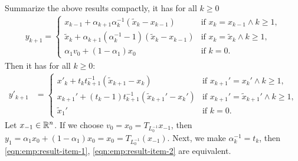 \documentclass[12pt]{report}
\begin{document}
\begin{example}
            \par
            Summarize the above results compactly, it has for all $k \ge 0$
            \begin{align}\label{eqn:emp:result-item-1}
                y_{k + 1} = \begin{cases}
                    x_{k - 1} + \alpha_{k + 1}\alpha_k^{-1}(\tilde x_k - x_{k - 1})
                    & \text{if } x_k = x_{k - 1} \wedge k \ge 1,
                    \\
                    \tilde x_k + \alpha_{k + 1}(\alpha_k^{-1} - 1)(\tilde x_k - x_{k - 1})
                    & \text{if } x_k = \tilde x_k \wedge k \ge 1,
                    \\
                    \alpha_1v_0 + (1 - \alpha_1)x_0 & \text{if } k = 0. 
                \end{cases}
            \end{align}
            Then it has for all $k \ge 0$: 
            \begin{align}\label{eqn:emp:result-item-2}
                y'_{k + 1} &= 
                \begin{cases}
                    x'_k + t_kt_{k + 1}^{-1}(\tilde x_{k + 1} - x_k) 
                    & \text{if } x_{k + 1}' = x_k' \wedge k \ge 1,
                    \\
                    x_{k + 1}' + (t_k - 1)t_{k + 1}^{-1}(\tilde x_{k + 1}' - x_k')  
                    & \text{if } x_{k + 1}' = \tilde x_{k + 1}'\wedge k \ge 1, 
                    \\
                    \tilde x_1'
                    & 
                    \text{if } k = 0. 
                \end{cases}
            \end{align}
            Let $x_{-1} \in \mathbb R^n$. 
            If we choose $v_0 = x_0 = T_{L_0^{-1}} x_{-1}$, then $y_1 = \alpha_1 x_0 + (1 - \alpha_1)x_0 = x_0 = T_{L_0^{-1}}(x_{-1})$.
            Next, we make $\alpha_k^{-1} = t_k$, then \eqref{eqn:emp:result-item-1}, \eqref{eqn:emp:result-item-2} are equivalent. 
        \end{example}
\end{document}
